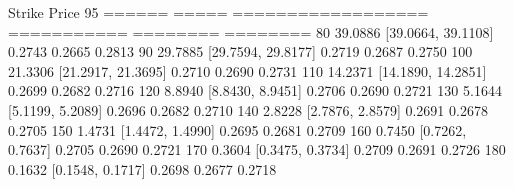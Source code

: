 Strike     Price     95%
======     =====     ==================    ===========    ========    ========
    80    39.0886   [39.0664, 39.1108]       0.2743     0.2665     0.2813
    90    29.7885   [29.7594, 29.8177]       0.2719     0.2687     0.2750
   100    21.3306   [21.2917, 21.3695]       0.2710     0.2690     0.2731
   110    14.2371   [14.1890, 14.2851]       0.2699     0.2682     0.2716
   120     8.8940   [8.8430, 8.9451]       0.2706     0.2690     0.2721
   130     5.1644   [5.1199, 5.2089]       0.2696     0.2682     0.2710
   140     2.8228   [2.7876, 2.8579]       0.2691     0.2678     0.2705
   150     1.4731   [1.4472, 1.4990]       0.2695     0.2681     0.2709
   160     0.7450   [0.7262, 0.7637]       0.2705     0.2690     0.2721
   170     0.3604   [0.3475, 0.3734]       0.2709     0.2691     0.2726
   180     0.1632   [0.1548, 0.1717]       0.2698     0.2677     0.2718